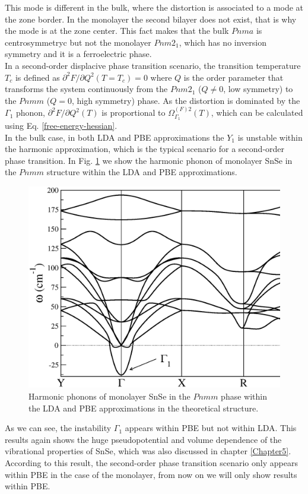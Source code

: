 This mode is different in the bulk, where the distortion is associated to a mode at the 
zone border. In the monolayer the second bilayer does not exist, that is why the mode is at the zone center. This 
fact makes that the bulk $Pnma$ is centrosymmetryc but not the monolayer $Pnm2_{1}$, which has no inversion symmetry 
and it is a ferroelectric phase. \\

In a second-order displacive phase transition scenario, the transition temperature $T_{c}$ is defined as 
$\partial^{2}F/\partial Q^{2}(T=T_{c})=0$ where $Q$ is the order parameter that transforms the system continuously 
from the $Pnm2_{1}$ ($Q\ne0$, low symmetry) to the $Pnmm$ ($Q=0$, high symmetry) phase. As the distortion is 
dominated by the $\Gamma_{1}$ phonon, $\partial^{2}F/\partial Q^{2}(T)$ is proportional to 
$\Omega^{(F)2}_{\Gamma_{1}}(T)$, which can be calculated using Eq. \ref{free-energy-hessian}. \\

In the bulk case, in both LDA and PBE approximations the $Y_{1}$ is unstable within the harmonic approximation, 
which is the typical scenario for a second-order phase transition. In Fig. \ref{harmonic-mono} we show the 
harmonic phonon of monolayer SnSe in the $Pnmm$ structure within the LDA and PBE approximations. 
\begin{figure}[h]
\includegraphics[width=\linewidth]{Figures/harmonic-mono.eps}
\caption[Harmonic phonons of monolayer SnSe.]{Harmonic phonons of monolayer SnSe in the $Pnmm$ phase within the LDA 
and PBE approximations in the theoretical structure.}
\label{harmonic-mono}
\end{figure}
As we can see, the instability $\Gamma_{1}$ appears within PBE but not within LDA. This results again shows the huge 
pseudopotential and volume dependence of the vibrational properties of SnSe, which was also discussed in 
chapter \ref{Chapter5}. According to this result, the second-order phase transition scenario only appears within PBE 
in the case of the monolayer, from now on we will only show results within PBE. \\

